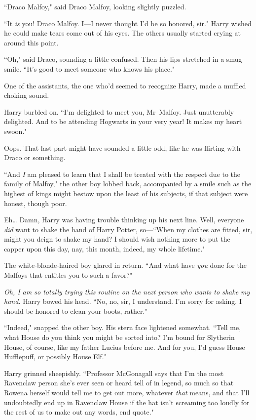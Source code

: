 ``Draco Malfoy," said Draco Malfoy, looking slightly puzzled.

``It \emph{is} you! Draco Malfoy. I—I never thought I'd be so honored, sir." Harry wished he could make tears come out of his eyes. The others usually started crying at around this point.

``Oh," said Draco, sounding a little confused. Then his lips stretched in a smug smile. ``It's good to meet someone who knows his place."

One of the assistants, the one who'd seemed to recognize Harry, made a muffled choking sound.

Harry burbled on. ``I'm delighted to meet you, Mr~Malfoy. Just unutterably delighted. And to be attending Hogwarts in your very year! It makes my heart swoon."

Oops. That last part might have sounded a little odd, like he was flirting with Draco or something.

``And \emph{I} am pleased to learn that I shall be treated with the respect due to the family of Malfoy," the other boy lobbed back, accompanied by a smile such as the highest of kings might bestow upon the least of his subjects, if that subject were honest, though poor.

Eh{\ldots} Damn, Harry was having trouble thinking up his next line. Well, everyone \emph{did} want to shake the hand of Harry Potter, so—``When my clothes are fitted, sir, might you deign to shake my hand? I should wish nothing more to put the capper upon this day, nay, this month, indeed, my whole lifetime."

The white-blonde-haired boy glared in return. ``And what have \emph{you} done for the Malfoys that entitles you to such a favor?"

\emph{Oh, I am so totally trying this routine on the next person who wants to shake my hand.} Harry bowed his head. ``No, no, sir, I understand. I'm sorry for asking. I should be honored to clean your boots, rather."

``Indeed," snapped the other boy. His stern face lightened somewhat. ``Tell me, what House do you think you might be sorted into? I'm bound for Slytherin House, of course, like my father Lucius before me. And for you, I'd guess House Hufflepuff, or possibly House Elf."

Harry grinned sheepishly. ``Professor McGonagall says that I'm the most Ravenclaw person she's ever seen or heard tell of in legend, so much so that Rowena herself would tell me to get out more, whatever \emph{that} means, and that I'll undoubtedly end up in Ravenclaw House if the hat isn't screaming too loudly for the rest of us to make out any words, end quote."

